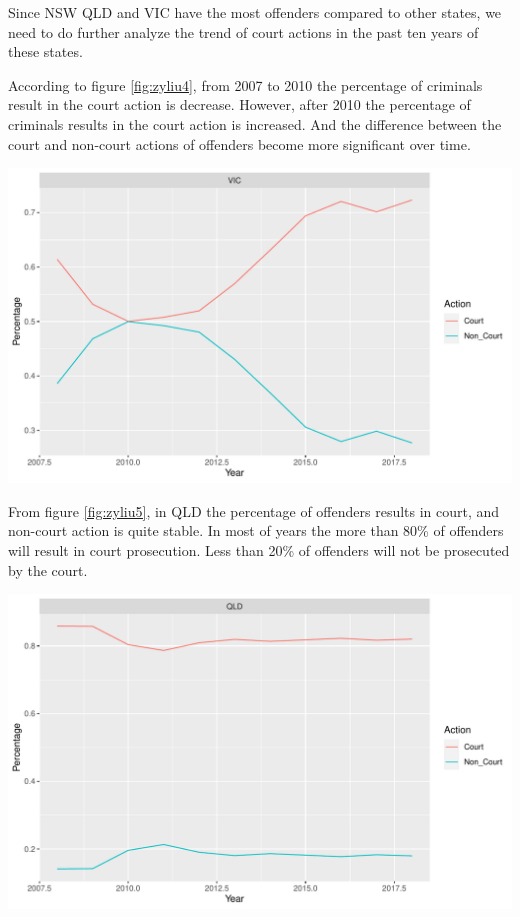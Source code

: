 \documentclass[11pt,a4paper,]{article}
\let\origfigure\figure
\let\endorigfigure\endfigure
\renewenvironment{figure}[1][2] {
\expandafter\origfigure\expandafter[H]
} {
\endorigfigure
}
\begin{document}
Since NSW QLD and VIC have the most offenders compared to other states, we need to do further analyze the trend of court actions in the past ten years of these states.

According to figure \ref{fig:zyliu4}, from 2007 to 2010 the percentage of criminals result in the court action is decrease. However, after 2010 the percentage of criminals results in the court action is increased. And the difference between the court and non-court actions of offenders become more significant over time.

\begin{figure}

{\centering \includegraphics{ETC5513-Assignment4_files/figure-latex/zyliu4-1} 

}

\caption{Court actions of offenders in VIC}\label{fig:zyliu4}
\end{figure}

From figure \ref{fig:zyliu5}, in QLD the percentage of offenders results in court, and non-court action is quite stable. In most of years the more than 80\% of offenders will result in court prosecution. Less than 20\% of offenders will not be prosecuted by the court.

\begin{figure}

{\centering \includegraphics{ETC5513-Assignment4_files/figure-latex/zyliu5-1} 

}

\caption{Court actions of offenders in QLD}\label{fig:zyliu5}
\end{figure}
\end{document}
